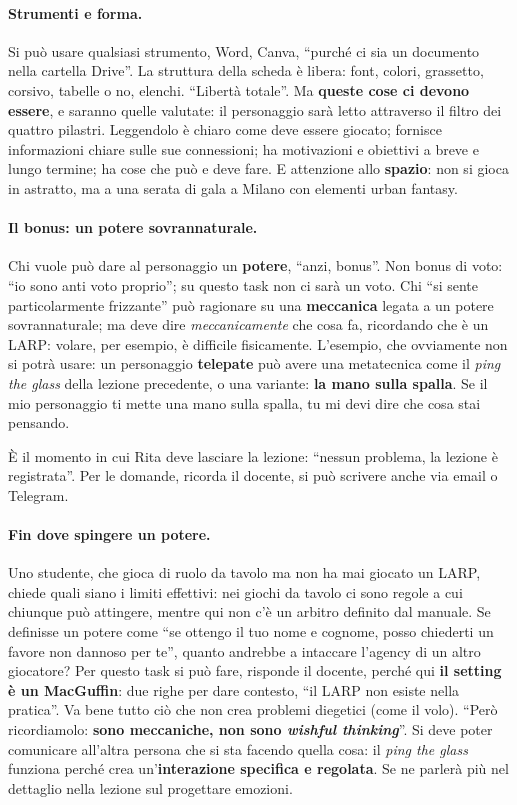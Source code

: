 \paragraph{Strumenti e forma.} Si può usare qualsiasi strumento, Word, Canva,
``purché ci sia un documento nella cartella Drive''. La struttura della scheda è
libera: font, colori, grassetto, corsivo, tabelle o no, elenchi. ``Libertà totale''.
Ma \textbf{queste cose ci devono essere}, e saranno quelle valutate: il personaggio
sarà letto attraverso il filtro dei quattro pilastri. Leggendolo è chiaro come deve
essere giocato; fornisce informazioni chiare sulle sue connessioni; ha motivazioni e
obiettivi a breve e lungo termine; ha cose che può e deve fare. E attenzione allo
\textbf{spazio}: non si gioca in astratto, ma a una serata di gala a Milano con
elementi urban fantasy.

\paragraph{Il bonus: un potere sovrannaturale.} Chi vuole può dare al personaggio un
\textbf{potere}, ``anzi, bonus''. Non bonus di voto: ``io sono anti voto proprio''; su
questo task non ci sarà un voto. Chi ``si sente particolarmente frizzante'' può
ragionare su una \textbf{meccanica} legata a un potere sovrannaturale; ma deve dire
\emph{meccanicamente} che cosa fa, ricordando che è un LARP: volare, per esempio, è
difficile fisicamente. L'esempio, che ovviamente non si potrà usare: un personaggio
\textbf{telepate} può avere una metatecnica come il \emph{ping the glass} della
lezione precedente, o una variante: \textbf{la mano sulla spalla}. Se il mio
personaggio ti mette una mano sulla spalla, tu mi devi dire che cosa stai pensando.

È il momento in cui Rita deve lasciare la lezione: ``nessun problema, la lezione è
registrata''. Per le domande, ricorda il docente, si può scrivere anche via email o
Telegram.

\paragraph{Fin dove spingere un potere.} Uno studente, che gioca di ruolo da tavolo
ma non ha mai giocato un LARP, chiede quali siano i limiti effettivi: nei giochi da
tavolo ci sono regole a cui chiunque può attingere, mentre qui non c'è un arbitro
definito dal manuale. Se definisse un potere come ``se ottengo il tuo nome e
cognome, posso chiederti un favore non dannoso per te'', quanto andrebbe a intaccare
l'agency di un altro giocatore? Per questo task si può fare, risponde il docente,
perché qui \textbf{il setting è un MacGuffin}: due righe per dare contesto, ``il LARP
non esiste nella pratica''. Va bene tutto ciò che non crea problemi diegetici (come
il volo). ``Però ricordiamolo: \textbf{sono meccaniche, non sono \emph{wishful
thinking}}''. Si deve poter comunicare all'altra persona che si sta facendo quella
cosa: il \emph{ping the glass} funziona perché crea un'\textbf{interazione specifica e
regolata}. Se ne parlerà più nel dettaglio nella lezione sul progettare emozioni.

